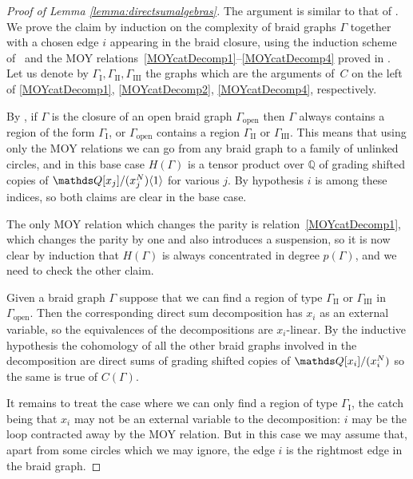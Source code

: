 \documentclass{compositio}
\theoremstyle{definition}
\numberwithin{equation}{section}
\begin{document}
\begin{proof}[Proof of Lemma \ref{lemma:directsumalgebras}]
The argument is similar to that of \cite[Lemma 5.8]{r0607544}. We prove the claim by induction on the complexity of braid graphs $\Gamma$ together with a chosen edge $i$ appearing in the braid closure, using the induction scheme of~\cite{w0508064} and the MOY relations~\eqref{MOYcatDecomp1}--\eqref{MOYcatDecomp4} proved in \cite[Section 6]{kr0401268}. Let us denote by $\Gamma_{\text{I}}, \Gamma_{\text{II}}, \Gamma_{\text{III}}$ the graphs which are the arguments of~$C$ on the left of \eqref{MOYcatDecomp1}, \eqref{MOYcatDecomp2}, \eqref{MOYcatDecomp4}, respectively. 

By \cite{w0508064}, if $\Gamma$ is the closure of an open braid graph $\Gamma_{\text{open}}$ then $\Gamma$ always contains a region of the form $\Gamma_{\text{I}}$, or $\Gamma_{\text{open}}$ contains a region $\Gamma_{\text{II}}$ or $\Gamma_{\text{III}}$. This means that using only the MOY relations we can go from any braid graph to a family of unlinked circles, and in this base case $H(\Gamma)$ is a tensor product over $\mathds{Q}$ of grading shifted copies of $\QQ[x_j]/(x_j^N)\langle 1 \rangle$ for various $j$. By hypothesis $i$ is among these indices, so both claims are clear in the base case.

The only MOY relation which changes the parity is relation~\eqref{MOYcatDecomp1}, which changes the parity by one and also introduces a suspension, so it is now clear by induction that $H(\Gamma)$ is always concentrated in degree $p(\Gamma)$, and we need to check the other claim.

Given a braid graph $\Gamma$ suppose that we can find a region of type $\Gamma_{\text{II}}$ or $\Gamma_{\text{III}}$ in $\Gamma_{\text{open}}$. Then the corresponding direct sum decomposition has $x_i$ as an external variable, so the equivalences of the decompositions are $x_i$-linear. By the inductive hypothesis the cohomology of all the other braid graphs involved in the decomposition are direct sums of grading shifted copies of $\QQ[x_i]/(x_i^N)$ so the same is true of $C(\Gamma)$.

It remains to treat the case where we can only find a region of type $\Gamma_{\text{I}}$, the catch being that $x_i$ may not be an external variable to the decomposition: $i$ may be the loop contracted away by the MOY relation. But in this case we may assume that, apart from some circles which we may ignore, the edge $i$ is the rightmost edge in the braid graph. 


\end{proof}
\end{document}
